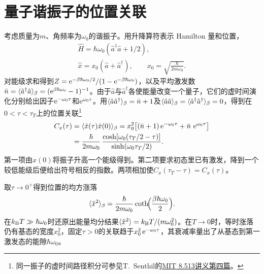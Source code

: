 \section{量子谐振子的位置关联}
考虑质量为$m$、角频率为$\omega_0$的谐振子。用升降算符表示 Hamilton 量和位置，
\begin{gather*}
	\hat H = \hbar\omega_0(\hat a^\dagger\hat a + 1/2),\\
	\hat x = x_0(\hat a + \hat a^\dagger),\qquad
	x_0 = \sqrt{\frac{\hbar}{2m\omega_0}} .
\end{gather*}
对能级求和得到$Z = \mathop{}\!\mathrm{e}^{-\beta\hbar\omega_0/2}/(1 - \mathop{}\!\mathrm{e}^{-\beta\hbar\omega_0})$，以及平均激发数$\bar n = \langle\hat a^\dagger\hat a\rangle_\beta = (\mathop{}\!\mathrm{e}^{\beta\hbar\omega_0} - 1)^{-1}$。由于$\hat a$与$\hat a^\dagger$各使能量改变一个量子，它们的虚时间演化分别给出因子$\mathop{}\!\mathrm{e}^{-\omega_0\tau}$和$\mathop{}\!\mathrm{e}^{\omega_0\tau}$。用$\langle\hat a\hat a^\dagger\rangle_\beta = \bar n + 1$及$\langle\hat a\hat a\rangle_\beta = \langle\hat a^\dagger\hat a^\dagger\rangle_\beta = 0$，得到在$0 < \tau < \tau_T$上的位置关联\footnote{同一振子的虚时间路径积分可参见T.~Senthil的\href{https://ocw.mit.edu/courses/8-513-many-body-theory-for-condensed-matter-systems-fall-2004/resources/notes4/}{MIT 8.513讲义第四篇}。}
\begin{align}
	C_x(\tau) &= \langle\hat x(\tau)\hat x(0)\rangle_\beta
	= x_0^2\bigl[(\bar n + 1)\mathop{}\!\mathrm{e}^{-\omega_0\tau} + \bar n\,\mathop{}\!\mathrm{e}^{\omega_0\tau}\bigr]\notag\\
	&= \frac{\hbar}{2m\omega_0}\,
	\frac{\cosh[\omega_0(\tau_T/2 - \tau)]}{\sinh(\omega_0\tau_T/2)} .
	\label{eq:sm-oscillator-imaginary}
\end{align}
第一项由$\hat x(0)$将振子升高一个能级得到。第二项要求初态里已有激发，降到一个较低能级后便给出符号相反的指数。两项相加使$C_x(\tau_T - \tau) = C_x(\tau)$。

取$\tau \to 0^+$得到位置的均方涨落
\begin{equation}
	\label{eq:sm-oscillator-thermal-variance}
	\langle\hat x^2\rangle_\beta = \frac{\hbar}{2m\omega_0}
	\coth\!\Bigl(\frac{\beta\hbar\omega_0}{2}\Bigr) .
\end{equation}
在$k_{\mathrm{B}} T \gg \hbar\omega_0$时还原出能量均分结果$\langle\hat x^2\rangle = k_{\mathrm{B}} T/(m\omega_0^2)$。在$T \to 0$时，等时涨落仍有基态的宽度$x_0^2$，固定$\tau > 0$的关联趋于$x_0^2\mathop{}\!\mathrm{e}^{-\omega_0\tau}$，其衰减率量出了从基态到第一激发态的能隙$\hbar\omega_0$。

